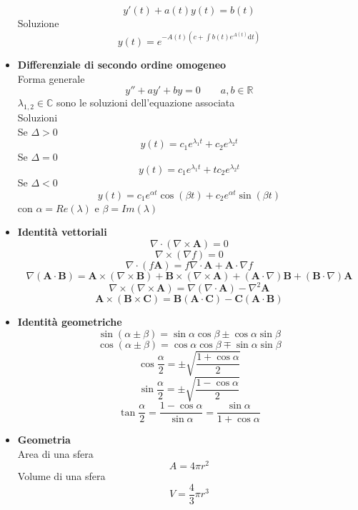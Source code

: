 \documentclass{book}
\newcommand{\g}{\textbf}
\newcommand{\h}{\mathbf}
\newcommand{\e}{\begin{equation}}
\newcommand{\ex}{\end{equation} }
\renewcommand{\it}{\item[$\cdot$]}
\begin{document}
\begin{multicols}{4}
\begin{itemize}
        \e{y'(t)+a(t)y(t)=b(t)}\ex
        Soluzione
        \e{y(t)=e^{-A(t)(c+\int b(t)e^{A(t)}\mathrm{d}t)}}\ex
        \it \g{Differenziale di secondo ordine omogeneo}\\
        Forma generale
        \e{y''+ay'+by=0 \qquad a,b\in\mathbb{R}}\ex
        $\lambda_{1,2}\in\mathbb{C}$ sono le soluzioni dell'equazione associata \\
        Soluzioni \\
            Se $\Delta>0$
            \e{y(t)=c_1e^{\lambda_1t}+c_2e^{\lambda_2t}}\ex
            Se $\Delta=0$
            \e{y(t)=c_1e^{\lambda_1t}+tc_2e^{\lambda_2t}}\ex
            Se $\Delta<0$
            \e{y(t)=c_1e^{\alpha t}\cos(\beta t)+c_2e^{\alpha t}\sin(\beta t)}\ex
            con $\alpha=Re(\lambda)$ e $\beta=Im(\lambda)$ \\
    \it \g{Identità vettoriali}
        \e{\nabla\cdot(\nabla\times \h{A})=0}\ex
        \e{\nabla\times(\nabla f)=0}\ex
        \e{\nabla\cdot(f\h{A})=f\nabla\cdot\h{A}+\h{A}\cdot\nabla f}\ex
        \e{\nabla(\h{A}\cdot\h{B})=\h{A}\times(\nabla\times\h{B})+\h{B}\times(\nabla\times\h{A})+(\h{A}\cdot\nabla)\h{B}+(\h{B}\cdot\nabla)\h{A}}\ex
        \e{\nabla\times(\nabla\times\h{A})=\nabla(\nabla\cdot\h{A})-\nabla^2\h{A}}\ex
        \e{\h{A}\times(\h{B}\times\h{C})=\h{B}(\h{A}\cdot\h{C})-\h{C}(\h{A}\cdot\h{B})} \ex
    \it \g{Identità geometriche}
        \e{\sin(\alpha\pm\beta)=\sin\alpha\cos\beta\pm\cos\alpha\sin\beta}\ex
        \e{\cos(\alpha\pm\beta)=\cos\alpha\cos\beta\mp\sin\alpha\sin\beta}\ex
        \e{\cos\frac{\alpha}{2}=\pm\sqrt{\frac{1+\cos\alpha}{2}}}\ex
        \e{\sin\frac{\alpha}{2}=\pm\sqrt{\frac{1-\cos\alpha}{2}}}\ex
        \e{\tan\frac{\alpha}{2}=\frac{1-\cos\alpha}{\sin\alpha}=\frac{\sin\alpha}{1+\cos\alpha}}\ex
    \it \g{Geometria}\\
    Area di una sfera
    \e{A = 4 \pi r^2}\ex
    Volume di una sfera
    \e{V = \frac{4}{3}\pi r^3}\ex
\end{itemize}
\end{multicols}
\end{document}
